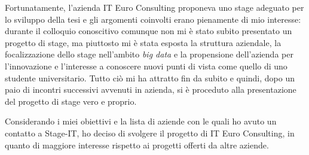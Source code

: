 Fortunatamente, l'azienda IT Euro Consulting proponeva uno stage adeguato per lo sviluppo della tesi e gli argomenti coinvolti erano pienamente di mio interesse: durante il colloquio conoscitivo comunque non mi è stato subito presentato un progetto di stage, ma piuttosto mi è stata esposta la struttura aziendale, la focalizzazione dello stage nell'ambito \textit{big data} e la propensione dell'azienda per l'innovazione e l'interesse a conoscere nuovi punti di vista come quello di uno studente universitario. Tutto ciò mi ha attratto fin da subito e quindi, dopo un paio di incontri successivi avvenuti in azienda, si è proceduto alla presentazione del progetto di stage vero e proprio.

Considerando i miei obiettivi e la lista di aziende con le quali ho avuto un contatto a Stage-IT, ho deciso di svolgere il progetto di IT Euro Consulting, in quanto di maggiore interesse rispetto ai progetti offerti da altre aziende.

